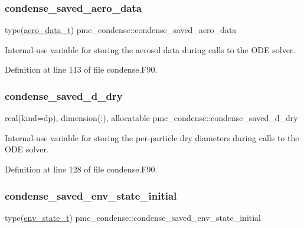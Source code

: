 \subsubsection{\texorpdfstring{condense\+\_\+saved\+\_\+aero\+\_\+data}{condense\_saved\_aero\_data}}
{\footnotesize\ttfamily type(\mbox{\hyperlink{structpmc__aero__data_1_1aero__data__t}{aero\+\_\+data\+\_\+t}}) pmc\+\_\+condense\+::condense\+\_\+saved\+\_\+aero\+\_\+data}



Internal-\/use variable for storing the aerosol data during calls to the O\+DE solver. 



Definition at line 113 of file condense.\+F90.

\mbox{\label{namespacepmc__condense_a30c34390a80570ea680b53c2ab971b50}} 
\subsubsection{\texorpdfstring{condense\+\_\+saved\+\_\+d\+\_\+dry}{condense\_saved\_d\_dry}}
{\footnotesize\ttfamily real(kind=dp), dimension(\+:), allocatable pmc\+\_\+condense\+::condense\+\_\+saved\+\_\+d\+\_\+dry}



Internal-\/use variable for storing the per-\/particle dry diameters during calls to the O\+DE solver. 



Definition at line 128 of file condense.\+F90.

\mbox{\label{namespacepmc__condense_af55aca988067bd27f35a3c34e2f5a4cd}} 
\subsubsection{\texorpdfstring{condense\+\_\+saved\+\_\+env\+\_\+state\+\_\+initial}{condense\_saved\_env\_state\_initial}}
{\footnotesize\ttfamily type(\mbox{\hyperlink{structpmc__env__state_1_1env__state__t}{env\+\_\+state\+\_\+t}}) pmc\+\_\+condense\+::condense\+\_\+saved\+\_\+env\+\_\+state\+\_\+initial}



